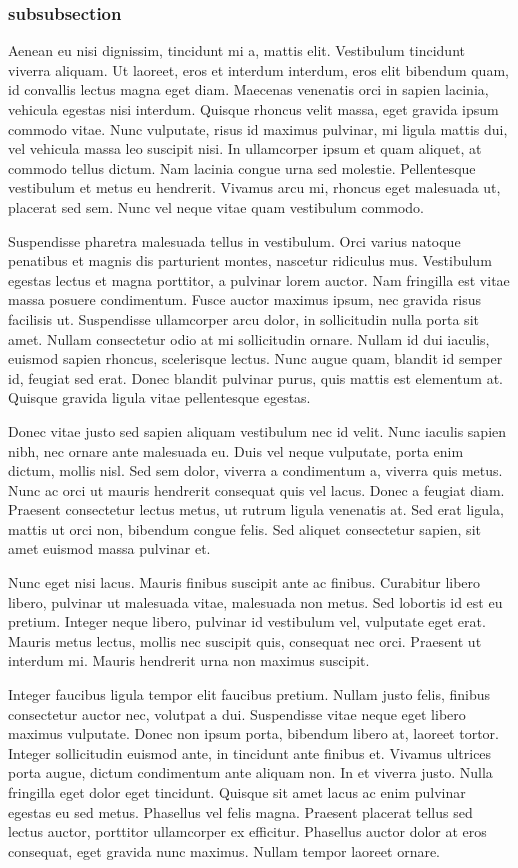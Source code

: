 \documentclass[9pt, letterpaper, twocolumn]{article}
\begin{document}
\subsubsection{subsubsection}
Aenean eu nisi dignissim, tincidunt mi a, mattis elit. Vestibulum tincidunt viverra aliquam. Ut laoreet, eros et interdum interdum, eros elit bibendum quam, id convallis lectus magna eget diam. Maecenas venenatis orci in sapien lacinia, vehicula egestas nisi interdum. Quisque rhoncus velit massa, eget gravida ipsum commodo vitae. Nunc vulputate, risus id maximus pulvinar, mi ligula mattis dui, vel vehicula massa leo suscipit nisi. In ullamcorper ipsum et quam aliquet, at commodo tellus dictum. Nam lacinia congue urna sed molestie. Pellentesque vestibulum et metus eu hendrerit. Vivamus arcu mi, rhoncus eget malesuada ut, placerat sed sem. Nunc vel neque vitae quam vestibulum commodo.

Suspendisse pharetra malesuada tellus in vestibulum. Orci varius natoque penatibus et magnis dis parturient montes, nascetur ridiculus mus. Vestibulum egestas lectus et magna porttitor, a pulvinar lorem auctor. Nam fringilla est vitae massa posuere condimentum. Fusce auctor maximus ipsum, nec gravida risus facilisis ut. Suspendisse ullamcorper arcu dolor, in sollicitudin nulla porta sit amet. Nullam consectetur odio at mi sollicitudin ornare. Nullam id dui iaculis, euismod sapien rhoncus, scelerisque lectus. Nunc augue quam, blandit id semper id, feugiat sed erat. Donec blandit pulvinar purus, quis mattis est elementum at. Quisque gravida ligula vitae pellentesque egestas.

Donec vitae justo sed sapien aliquam vestibulum nec id velit. Nunc iaculis sapien nibh, nec ornare ante malesuada eu. Duis vel neque vulputate, porta enim dictum, mollis nisl. Sed sem dolor, viverra a condimentum a, viverra quis metus. Nunc ac orci ut mauris hendrerit consequat quis vel lacus. Donec a feugiat diam. Praesent consectetur lectus metus, ut rutrum ligula venenatis at. Sed erat ligula, mattis ut orci non, bibendum congue felis. Sed aliquet consectetur sapien, sit amet euismod massa pulvinar et.

Nunc eget nisi lacus. Mauris finibus suscipit ante ac finibus. Curabitur libero libero, pulvinar ut malesuada vitae, malesuada non metus. Sed lobortis id est eu pretium. Integer neque libero, pulvinar id vestibulum vel, vulputate eget erat. Mauris metus lectus, mollis nec suscipit quis, consequat nec orci. Praesent ut interdum mi. Mauris hendrerit urna non maximus suscipit.

Integer faucibus ligula tempor elit faucibus pretium. Nullam justo felis, finibus consectetur auctor nec, volutpat a dui. Suspendisse vitae neque eget libero maximus vulputate. Donec non ipsum porta, bibendum libero at, laoreet tortor. Integer sollicitudin euismod ante, in tincidunt ante finibus et. Vivamus ultrices porta augue, dictum condimentum ante aliquam non. In et viverra justo. Nulla fringilla eget dolor eget tincidunt. Quisque sit amet lacus ac enim pulvinar egestas eu sed metus. Phasellus vel felis magna. Praesent placerat tellus sed lectus auctor, porttitor ullamcorper ex efficitur. Phasellus auctor dolor at eros consequat, eget gravida nunc maximus. Nullam tempor laoreet ornare.
\end{document}
